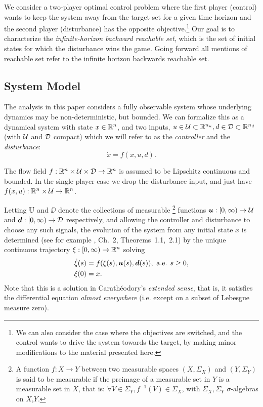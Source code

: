 
We consider a two-player optimal control problem where the first player (control) wants to keep the system away from the target set for a given time horizon and the second player (disturbance) has the opposite objective.\footnote{We can also consider the case where the objectives are switched, and the control wants to drive the system towards the target, by making minor modifications to the material presented here.} Our goal is to characterize the \emph{infinite-horizon backward reachable set}, which is the set of initial states for which the disturbance wins the game. Going forward all mentions of reachable set refer to the infinite horizon backwards reachable set.

\subsection{System Model \label{subsec:dynamics}}

The analysis in this paper considers a fully observable system whose underlying dynamics may be non-deterministic, but bounded. 
We can formalize this as a dynamical system with state $x\in\mathbb{R}^n$, and two inputs, $u\in\mathcal{U}\subset\mathbb{R}^{n_u},  d\in\mathcal{D}\subset\mathbb{R}^{n_d}$
(with $\mathcal{U}$ and $\mathcal{D}$ compact)
which we will refer to as the \emph{controller} and the \emph{disturbance}:
\begin{equation}\label{fxud}
\dot{x} = f(x,u, d).
\end{equation}

The flow field $f: \mathbb{R}^n \times \mathcal{U} \times \mathcal{D}\rightarrow\mathbb{R}^n$ is assumed to be Lipschitz continuous and bounded. In the single-player case we drop the disturbance input, and just have ${f(x,u):\mathbb{R}^n \times \mathcal{U} \rightarrow\mathbb{R}^n}$.

Letting $\mathbb{U} $ and $\DD$ denote the collections of measurable%
	\footnote{A function $f:X\to Y$ between two measurable spaces $(X,\Sigma_X)$ and $(Y,\Sigma_Y)$
	is said to be measurable if the preimage of a measurable set in $Y$ is a measurable set in $X$, that is:
	$\forall V\in\Sigma_Y, f^{-1}(V)\in\Sigma_X$, with $\Sigma_X,\Sigma_Y$ $\sigma$-algebras on $X$,$Y$.}
functions $\bm u: [0,\infty)\to \mathcal{U} $ and $\bm d: [0,\infty)\to \mathcal{D}$ respectively,
and allowing the controller and disturbance to choose any such signals,
the evolution of the system
from any initial state $x$
is determined (see for example \cite{Coddington1955}, Ch.~2, Theorems~1.1,~2.1) by the unique continuous trajectory $\xi:[0,\infty)\to\mathbb{R}^n$ solving
\begin{equation}\label{eq:xdot}
\begin{split}
\dot{\xi}(s) &= f(\xi(s),\bm{u}(s),\bm{d}(s)), \text{ a.e. }s\ge 0,\\
\xi(0) &= x.
\end{split}
\end{equation}
Note that this is a solution in Carath\'eodory's \emph{extended sense}, that is, it satisfies the differential equation \emph{almost everywhere} (i.e. except on a subset of Lebesgue measure zero).


